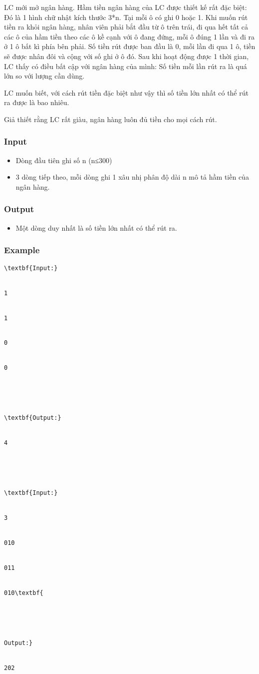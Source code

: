 



   LC mới mở ngân hàng. Hầm tiền ngân hàng của LC được thiết kế rất đặc biệt: Đó là 1 hình chữ nhật kích thước 3*n. Tại mỗi ô có ghi 0 hoặc 1. Khi muốn rút tiền ra khỏi ngân hàng, nhân viên phải bắt đầu từ ô trên trái, đi qua hết tất cả các ô của hầm tiền theo các ô kề cạnh với ô đang đứng, mỗi ô đúng 1 lần và đi ra ở 1 ô bất kì phía bên phải. Số tiền rút được ban đầu là 0, mỗi lần đi qua 1 ô, tiền sẽ được nhân đôi và cộng với số ghi ở ô đó. Sau khi hoạt động được 1 thời gian, LC thấy có điều bất cập với ngân hàng của mình: Số tiền mỗi lần rút ra là quá lớn so với lượng cần dùng.  

   LC muốn biết, với cách rút tiền đặc biệt như vậy thì số tiền lớn nhất có thể rút ra được là bao nhiêu.  

Giả thiết rằng LC rất giàu, ngân hàng luôn đủ tiền cho mọi cách rút.

\subsubsection{   Input  }
\begin{itemize}
	\item     Dòng đầu tiên ghi số n (n≤300)   
	\item     3 dòng tiếp theo, mỗi dòng ghi 1 xâu nhị phân độ dài n mô tả hầm tiền của ngân hàng.   
\end{itemize}

\subsubsection{   Output  }
\begin{itemize}
	\item     Một dòng duy nhất là số tiền lớn nhất có thể rút ra.   
\end{itemize}

\subsubsection{   Example  }
\begin{verbatim}
\textbf{Input:}


1


1


0


0





\textbf{Output:}


4





\textbf{Input:}


3


010


011


010\textbf{





Output:}


202\end{verbatim}
